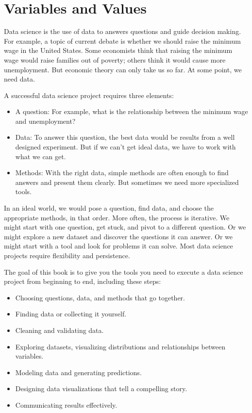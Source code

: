 \hypertarget{variables-and-values}{%
\chapter{Variables and Values}\label{variables-and-values}}

Data science is the use of data to answers questions and guide decision
making. For example, a topic of current debate is whether we should
raise the minimum wage in the United States. Some economists think that
raising the minimum wage would raise families out of poverty; others
think it would cause more unemployment. But economic theory can only
take us so far. At some point, we need data.

A successful data science project requires three elements:

\begin{itemize}
\item
  A question: For example, what is the relationship between the minimum
  wage and unemployment?
\item
  Data: To answer this question, the best data would be results from a
  well designed experiment. But if we can't get ideal data, we have to
  work with what we can get.
\item
  Methods: With the right data, simple methods are often enough to find
  answers and present them clearly. But sometimes we need more
  specialized tools.
\end{itemize}

In an ideal world, we would pose a question, find data, and choose the
appropriate methods, in that order. More often, the process is
iterative. We might start with one question, get stuck, and pivot to a
different question. Or we might explore a new dataset and discover the
questions it can answer. Or we might start with a tool and look for
problems it can solve. Most data science projects require flexibility
and persistence.

The goal of this book is to give you the tools you need to execute a
data science project from beginning to end, including these steps:

\begin{itemize}
\item
  Choosing questions, data, and methods that go together.
\item
  Finding data or collecting it yourself.
\item
  Cleaning and validating data.
\item
  Exploring datasets, visualizing distributions and relationships
  between variables.
\item
  Modeling data and generating predictions.
\item
  Designing data visualizations that tell a compelling story.
\item
  Communicating results effectively.
\end{itemize}


